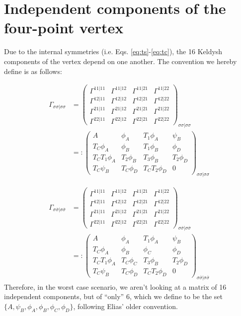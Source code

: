 \documentclass[12pt,a4paper,roman]{article}
\begin{document}
\section*{Independent components of the four-point vertex}
Due to the internal symmetries (i.e. Eqs. \ref{eq:ts}-\ref{eq:tc}), the 16 Keldysh components of the vertex depend on one another. The convention we hereby define is as follows:

\begin{align}
\Gamma_{\sigma\sigma|\sigma\sigma} &=
    \begin{pmatrix}
    \Gamma^{11|11} & \Gamma^{11|12} & \Gamma^{11|21} & \Gamma^{11|22} \\
    \Gamma^{12|11} & \Gamma^{12|12} & \Gamma^{12|21} & \Gamma^{12|22} \\
    \Gamma^{21|11} & \Gamma^{21|12} & \Gamma^{21|21} & \Gamma^{21|22} \\
    \Gamma^{22|11} & \Gamma^{22|12} & \Gamma^{22|21} & \Gamma^{22|22}
    \end{pmatrix}_{\sigma\sigma|\sigma\sigma}  \\
    & = :     \begin{pmatrix}
    A & \phi_A & T_1\phi_A & \psi_B \\
    T_C\phi_A & \phi_B & T_1\phi_B & \phi_D \\
    T_C T_1\phi_A & T_2 \phi_B & T_3\phi_B & T_2\phi_D \\
    T_C\psi_B & T_C\phi_D & T_CT_2\phi_D & 0
    \end{pmatrix}_{\sigma\sigma|\sigma\sigma} 
\end{align}

\begin{align}
\Gamma_{\sigma\overline{\sigma}|\sigma\overline{\sigma}} &=
    \begin{pmatrix}
    \Gamma^{11|11} & \Gamma^{11|12} & \Gamma^{11|21} & \Gamma^{11|22} \\
    \Gamma^{12|11} & \Gamma^{12|12} & \Gamma^{12|21} & \Gamma^{12|22} \\
    \Gamma^{21|11} & \Gamma^{21|12} & \Gamma^{21|21} & \Gamma^{21|22} \\
    \Gamma^{22|11} & \Gamma^{22|12} & \Gamma^{22|21} & \Gamma^{22|22}
    \end{pmatrix}_{\sigma\overline{\sigma}|\sigma\overline{\sigma}} \\
    & = :     \begin{pmatrix}
    A & \phi_A & T_1\phi_A & \psi_B \\
    T_C\phi_A & \phi_B & \phi_C & \phi_D \\
    T_C T_1\phi_A & T_C \phi_C & T_3\phi_B & T_2\phi_D \\
    T_C\psi_B & T_C\phi_D & T_CT_2\phi_D & 0
    \end{pmatrix}_{\sigma\overline{\sigma}|\sigma\overline{\sigma}}
\end{align}
Therefore, in the worst case scenario, we aren't looking at a matrix of 16 independent components, but of ``only'' 6, which we define to be the set $\{A, \psi_B, \phi_A, \phi_B, \phi_C, \phi_D\}$, following Elias' older convention.
\end{document}
